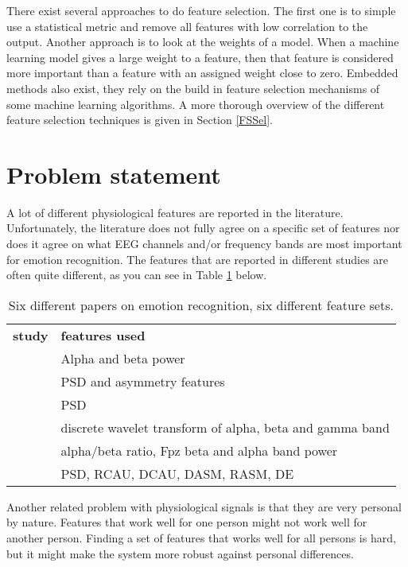 \clearpage

There exist several approaches to do feature selection. The first one is to simple use a statistical metric and remove all features with low correlation to the output. Another approach is to look at the weights of a model. When a machine learning model gives a large weight to a feature, then that feature is considered more important than a feature with an assigned weight close to zero. Embedded methods also exist, they rely on the build in feature selection mechanisms of some machine learning algorithms. A more thorough  overview of the different feature selection techniques is given in Section \ref{FSSel}. 

\section{Problem statement}

A lot of different physiological features are reported in the literature. Unfortunately, the literature does not fully agree on a specific set of features nor does it agree on what EEG channels and/or frequency bands are most important for emotion recognition. The features that are reported in different studies are often quite different, as you can see in Table \ref{diffFeat} below.

\begin{table}[H]
\centering
\begin{tabular}{ll}
\textbf{study} & \textbf{features used}                         \\
\citep{ref4}     & Alpha and beta power                           \\
\citep{ref7}     & PSD and asymmetry features                     \\
\citep{ref8}     & PSD                                            \\
\citep{ref6}     & discrete wavelet transform of alpha, beta and gamma band \\
\citep{ExtendedPaper}	&	alpha/beta ratio, Fpz beta and alpha band power \\
\citep{killyPaper} & PSD, RCAU, DCAU, DASM, RASM, DE \\
\end{tabular}
\caption{Six different papers on emotion recognition, six different feature sets\label{diffFeat}.}
\end{table}

\npar

Another related problem with physiological signals is that they are very personal by nature. Features that work well for one person might not work well for another person\citep{DEAP}. Finding a set of features that works well for all persons is hard, but it might make the system more robust against personal differences. 

